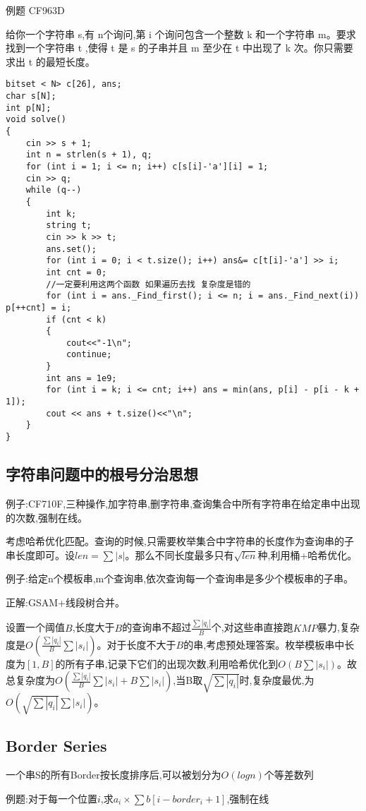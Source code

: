 \documentclass[a4paper,fontset=none]{ctexart}
\begin{document}
例题 CF963D

给你一个字符串 s,有 n个询问,第 i 个询问包含一个整数 k 和一个字符串 m。要求找到一个字符串 t ,使得 t 是 s 的子串并且 m 至少在 t 中出现了 k 次。你只需要求出 t 的最短长度。

\begin{verbatim}
bitset < N> c[26], ans;
char s[N];
int p[N];
void solve()
{
    cin >> s + 1;
    int n = strlen(s + 1), q;
    for (int i = 1; i <= n; i++) c[s[i]-'a'][i] = 1;
    cin >> q;
    while (q--)
    {
        int k;
        string t;
        cin >> k >> t;
        ans.set();
        for (int i = 0; i < t.size(); i++) ans&= c[t[i]-'a'] >> i;
        int cnt = 0;
        //一定要利用这两个函数 如果遍历去找 复杂度是错的
        for (int i = ans._Find_first(); i <= n; i = ans._Find_next(i)) p[++cnt] = i;
        if (cnt < k)
        {
            cout<<"-1\n";
            continue;
        }
        int ans = 1e9;
        for (int i = k; i <= cnt; i++) ans = min(ans, p[i] - p[i - k + 1]);
        cout << ans + t.size()<<"\n";
    }
}
\end{verbatim}
\subsection{字符串问题中的根号分治思想}

例子:CF710F,三种操作,加字符串,删字符串,查询集合中所有字符串在给定串中出现的次数,强制在线。

考虑哈希优化匹配。查询的时候,只需要枚举集合中字符串的长度作为查询串的子串长度即可。设$len=\sum|s|$。那么不同长度最多只有$\sqrt{len}$种,利用桶+哈希优化。

例子:给定n个模板串,m个查询串,依次查询每一个查询串是多少个模板串的子串。

正解:GSAM+线段树合并。

设置一个阈值$B$,长度大于$B$的查询串不超过$\frac{\sum|q_i|}{B}$个,对这些串直接跑$KMP$暴力,复杂度是$O(\frac{\sum|q_i|}{B}\sum|s_i|)$。对于长度不大于$B$的串,考虑预处理答案。枚举模板串中长度为$[1,B]$的所有子串,记录下它们的出现次数,利用哈希优化到$O(B\sum|s_i|)$。故总复杂度为$O(\frac{\sum|q_i|}{B}\sum|s_i|+B\sum|s_i|)$,当B取$\sqrt{\sum|q_i|}$时,复杂度最优,为$O(\sqrt{\sum|q_i|}\sum|s_i|)$。
\subsection{Border Series}

一个串S的所有Border按长度排序后,可以被划分为$O(logn)$个等差数列

例题:对于每一个位置$i$,求$a_i\times \sum b[i-border_i+1]$,强制在线
\end{document}
